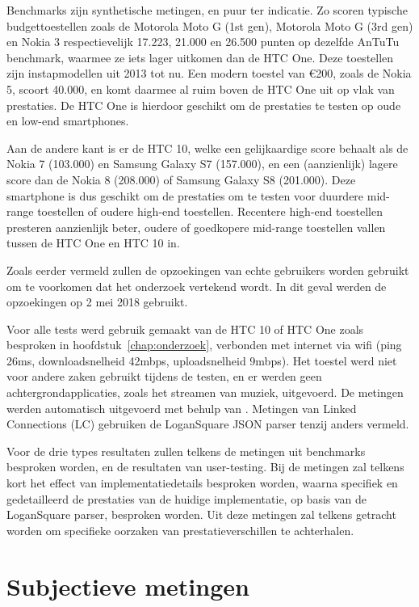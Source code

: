 Benchmarks zijn synthetische metingen, en puur ter indicatie. Zo scoren typische budgettoestellen zoals de Motorola Moto G (1st gen), Motorola Moto G (3rd gen) en Nokia 3 respectievelijk 17.223, 21.000 en 26.500 punten op dezelfde AnTuTu benchmark, waarmee ze iets lager uitkomen dan de HTC One. Deze toestellen zijn instapmodellen uit 2013 tot nu. Een modern toestel van €200, zoals de Nokia 5, scoort 40.000, en komt daarmee al ruim boven de HTC One uit op vlak van prestaties. De HTC One is hierdoor geschikt om de prestaties te testen op oude en low-end smartphones.

Aan de andere kant is er de HTC 10, welke een gelijkaardige score behaalt als de Nokia 7 (103.000) en Samsung Galaxy S7 (157.000), en een (aanzienlijk) lagere score dan de Nokia 8 (208.000) of Samsung Galaxy S8 (201.000). Deze smartphone is dus geschikt om de prestaties om te testen voor duurdere mid-range toestellen of oudere high-end toestellen. Recentere high-end toestellen presteren aanzienlijk beter, oudere of goedkopere mid-range toestellen vallen tussen de HTC One en HTC 10 in. 

Zoals eerder vermeld zullen de opzoekingen van echte gebruikers worden gebruikt om te voorkomen dat het onderzoek vertekend wordt. In dit geval werden de opzoekingen op 2 mei 2018 gebruikt.

Voor alle tests werd gebruik gemaakt van de HTC 10 of HTC One zoals besproken in hoofdstuk~\ref{chap:onderzoek}, verbonden met internet via wifi (ping 26ms, downloadsnelheid 42mbps, uploadsnelheid 9mbps). Het toestel werd niet voor andere zaken gebruikt tijdens de testen, en er werden geen achtergrondapplicaties, zoals het streamen van muziek, uitgevoerd. De metingen werden automatisch uitgevoerd met behulp van . Metingen van Linked Connections (LC) gebruiken de LoganSquare JSON parser tenzij anders vermeld.

Voor de drie types resultaten zullen telkens de metingen uit benchmarks besproken worden, en de resultaten van user-testing. Bij de metingen zal telkens kort het effect van implementatiedetails besproken worden, waarna specifiek en gedetailleerd de prestaties van de huidige implementatie, op basis van de LoganSquare parser, besproken worden. Uit deze metingen zal telkens getracht worden om specifieke oorzaken van prestatieverschillen te achterhalen.

\section{Subjectieve metingen}

